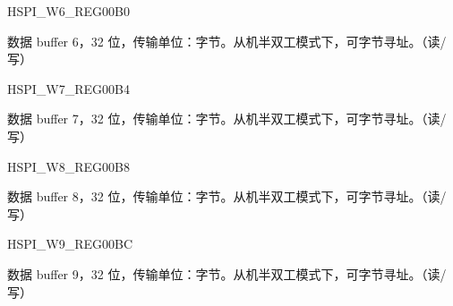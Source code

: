 \begin{register}{H}{SPI\_W6\_REG}{\hexprefix{}00B0}\label{regdesc:SPIW6REG}
%
\regnewline%
\begin{regdesc}\begin{reglist}
\label{fielddesc:SPIBUF6}\item [SPI\_BUF6] 数据 buffer 6，32 位，传输单位：字节。从机半双工模式下，可字节寻址。（读/写）
\end{reglist}\end{regdesc}
\end{register}


\begin{register}{H}{SPI\_W7\_REG}{\hexprefix{}00B4}\label{regdesc:SPIW7REG}
%
\regnewline%
\begin{regdesc}\begin{reglist}
\label{fielddesc:SPIBUF7}\item [SPI\_BUF7] 数据 buffer 7，32 位，传输单位：字节。从机半双工模式下，可字节寻址。（读/写）
\end{reglist}\end{regdesc}
\end{register}


\begin{register}{H}{SPI\_W8\_REG}{\hexprefix{}00B8}\label{regdesc:SPIW8REG}
%
\regnewline%
\begin{regdesc}\begin{reglist}
\label{fielddesc:SPIBUF8}\item [SPI\_BUF8] 数据 buffer 8，32 位，传输单位：字节。从机半双工模式下，可字节寻址。（读/写）
\end{reglist}\end{regdesc}
\end{register}


\begin{register}{H}{SPI\_W9\_REG}{\hexprefix{}00BC}\label{regdesc:SPIW9REG}
%
\regnewline%
\begin{regdesc}\begin{reglist}
\label{fielddesc:SPIBUF9}\item [SPI\_BUF9] 数据 buffer 9，32 位，传输单位：字节。从机半双工模式下，可字节寻址。（读/写）
\end{reglist}\end{regdesc}
\end{register}


